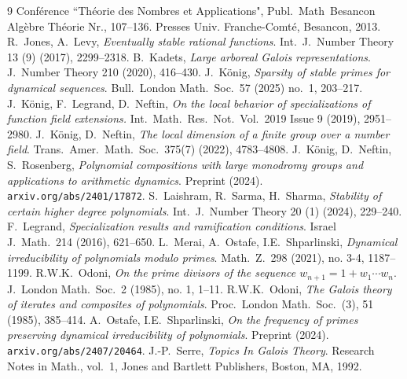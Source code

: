 \documentclass[a4paper]{amsart}
\begin{document}
\begin{thebibliography}{9}
{Conf\'erence ``Th\'eorie des Nombres et Applications"}, Publ.\ Math\ Besancon Alg\`ebre Th\'eorie Nr., 107--136. Presses Univ. Franche-Comt\'e, Besancon, 2013.
   R.\ Jones, A.\ Levy, \textit{Eventually stable rational functions}. Int.\ J.\ Number Theory 13 (9) (2017), 2299--2318.
   B.\ Kadets, \textit{Large arboreal Galois representations}. J.\ Number Theory 210 (2020), 416--430.
   J.\ K\"onig, \textit{Sparsity of stable primes for dynamical sequences}. Bull.\ London Math.\ Soc.\ 57 (2025) no.\ 1, 203--217.
   J.\ K\"onig, F.\ Legrand, D.\ Neftin, \textit{On the local behavior of specializations of function field extensions.} Int.\ Math.\ Res.\ Not.\ Vol.\ 2019 Issue 9 (2019), 2951--2980.
   J.\ K\"onig, D.\ Neftin, \textit{The local dimension of a finite group over a number field}. Trans.\ Amer.\ Math.\ Soc.\ 375(7) (2022), 4783--4808.
   J.\ K\"onig, D.\ Neftin, S.\ Rosenberg, \textit{Polynomial compositions with large monodromy groups and applications to arithmetic dynamics}. Preprint (2024). \texttt{arxiv.org/abs/2401/17872}.
   S.\ Laishram, R.\ Sarma, H.\ Sharma, \textit{Stability of certain higher degree polynomials}. Int.\ J.\ Number Theory 20 (1) (2024), 229--240.
   F.\ Legrand, \textit{Specialization results and ramification conditions}. Israel J.\ Math.\ 214 (2016), 621--650.
   L.\ Merai, A.\ Ostafe, I.E.\ Shparlinski, \textit{Dynamical irreducibility of polynomials modulo primes}. Math.\ Z.\ 298 (2021), no. 3-4, 1187--1199. 
   R.W.K.\ Odoni, \textit{On the prime divisors of the sequence $w_{n+1} = 1 + w_1\cdots w_n$}. J.\ London Math.\ Soc.\  2 (1985), no. 1, 1--11. 
   R.W.K.\ Odoni, \textit{The Galois theory of iterates and composites of polynomials}. Proc.\ London Math.\ Soc.\ (3), 51 (1985), 385--414.
   A.\ Ostafe, I.E.\ Shparlinski, \textit{On the frequency of primes preserving dynamical irreducibility of polynomials}. Preprint (2024). \texttt{arxiv.org/abs/2407/20464}.
   J.-P.\ Serre, \textit{Topics In Galois Theory}. Research Notes in Math., vol.\ 1, Jones and Bartlett Publishers, Boston, MA, 1992.
  \end{thebibliography}
  
\end{document}

